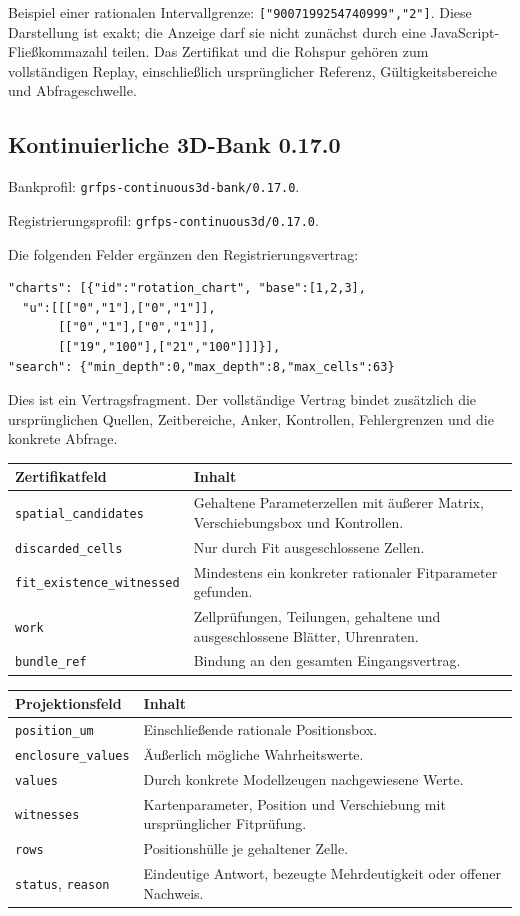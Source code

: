 \documentclass[11pt,a4paper]{article}
\begin{document}
Beispiel einer rationalen Intervallgrenze:
\texttt{["9007199254740999","2"]}. Diese Darstellung ist exakt;
die Anzeige darf sie nicht zunächst durch eine JavaScript-
Fließkommazahl teilen. Das Zertifikat und die Rohspur gehören
zum vollständigen Replay, einschließlich ursprünglicher Referenz,
Gültigkeitsbereiche und Abfrageschwelle.


\clearpage
\subsection{Kontinuierliche 3D-Bank 0.17.0}
Bankprofil: \texttt{grfps-continuous3d-bank/0.17.0}.\par
Registrierungsprofil: \texttt{grfps-continuous3d/0.17.0}.\par
Die folgenden Felder ergänzen den Registrierungsvertrag:
\begin{lstlisting}
"charts": [{"id":"rotation_chart", "base":[1,2,3],
  "u":[[["0","1"],["0","1"]],
       [["0","1"],["0","1"]],
       [["19","100"],["21","100"]]]}],
"search": {"min_depth":0,"max_depth":8,"max_cells":63}
\end{lstlisting}
Dies ist ein Vertragsfragment. Der vollständige Vertrag bindet
zusätzlich die ursprünglichen Quellen, Zeitbereiche, Anker,
Kontrollen, Fehlergrenzen und die konkrete Abfrage.

\begin{tabularx}{\linewidth}{@{}lY@{}}\toprule
Zertifikatfeld & Inhalt\\\midrule
\texttt{spatial\_candidates} & Gehaltene Parameterzellen mit äußerer Matrix, Verschiebungsbox und Kontrollen.\\
\texttt{discarded\_cells} & Nur durch Fit ausgeschlossene Zellen.\\
\texttt{fit\_existence\_witnessed} & Mindestens ein konkreter rationaler Fitparameter gefunden.\\
\texttt{work} & Zellprüfungen, Teilungen, gehaltene und ausgeschlossene Blätter, Uhrenraten.\\
\texttt{bundle\_ref} & Bindung an den gesamten Eingangsvertrag.\\\bottomrule
\end{tabularx}

\begin{tabularx}{\linewidth}{@{}lY@{}}\toprule
Projektionsfeld & Inhalt\\\midrule
\texttt{position\_um} & Einschließende rationale Positionsbox.\\
\texttt{enclosure\_values} & Äußerlich mögliche Wahrheitswerte.\\
\texttt{values} & Durch konkrete Modellzeugen nachgewiesene Werte.\\
\texttt{witnesses} & Kartenparameter, Position und Verschiebung mit ursprünglicher Fitprüfung.\\
\texttt{rows} & Positionshülle je gehaltener Zelle.\\
\texttt{status}, \texttt{reason} & Eindeutige Antwort, bezeugte Mehrdeutigkeit oder offener Nachweis.\\\bottomrule
\end{tabularx}
\end{document}
